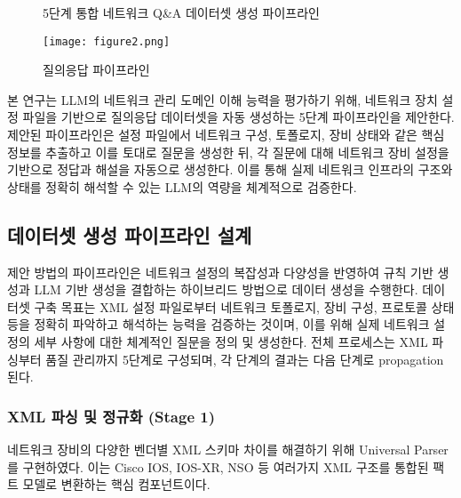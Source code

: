 \documentclass[twocolumn, 10pt]{article}
\begin{document}
\begin{figure}[t]
\centering
{}

\caption{5단계 통합 네트워크 Q\&A 데이터셋 생성 파이프라인}
\label{fig:pipeline}
\end{figure}

\begin{figure}[t]
\centering
\texttt{[image: figure2.png]}
\caption{질의응답 파이프라인}
\label{fig:hctl-top}
\end{figure}

본 연구는 LLM의 네트워크 관리 도메인 이해 능력을 평가하기 위해, 네트워크 장치 설정 파일을 기반으로 질의응답 데이터셋을 자동 생성하는 5단계 파이프라인을 제안한다. 제안된 파이프라인은 설정 파일에서 네트워크 구성, 토폴로지, 장비 상태와 같은 핵심 정보를 추출하고 이를 토대로 질문을 생성한 뒤, 각 질문에 대해 네트워크 장비 설정을 기반으로 정답과 해설을 자동으로 생성한다. 이를 통해 실제 네트워크 인프라의 구조와 상태를 정확히 해석할 수 있는 LLM의 역량을 체계적으로 검증한다.

\subsection{데이터셋 생성 파이프라인 설계}

제안 방법의 파이프라인은 네트워크 설정의 복잡성과 다양성을 반영하여 규칙 기반 생성과 LLM 기반 생성을 결합하는 하이브리드 방법으로 데이터 생성을 수행한다.
데이터셋 구축 목표는 XML 설정 파일로부터 네트워크 토폴로지, 장비 구성, 프로토콜 상태 등을 정확히 파악하고 해석하는 능력을 검증하는 것이며, 이를 위해 실제 네트워크 설정의 세부 사항에 대한 체계적인 질문을 정의 및 생성한다. 
전체 프로세스는 XML 파싱부터 품질 관리까지 5단계로 구성되며, 각 단계의 결과는 다음 단계로 propagation 된다.

\subsubsection{XML 파싱 및 정규화 (Stage 1)}
네트워크 장비의 다양한 벤더별 XML 스키마 차이를 해결하기 위해 Universal
Parser를 구현하였다. 이는 Cisco IOS, IOS-XR, NSO 등 여러가지 XML 구조를 통합된
팩트 모델로 변환하는 핵심 컴포넌트이다.
\end{document}
